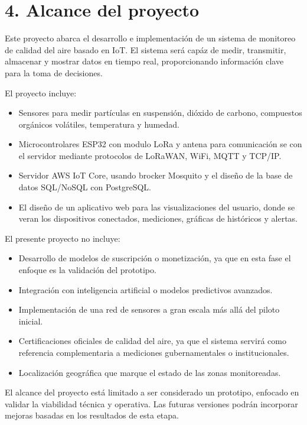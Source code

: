 \documentclass[
11pt, %
]{charter}
\begin{document}
\section{4. Alcance del proyecto}
\label{sec:alcance}

Este proyecto abarca el desarrollo e implementación de un sistema de monitoreo de calidad del aire basado en IoT. El sistema será capáz de medir, transmitir, almacenar y mostrar datos en tiempo real, proporcionando información clave para la toma de decisiones.

El proyecto incluye:

\begin{itemize}
	\item Sensores para medir partículas en suspensión, dióxido de carbono, compuestos orgánicos volátiles, temperatura y humedad.
	\item Microcontrolares ESP32 con modulo LoRa y antena para comunicación se con el servidor mediante protocolos de LoRaWAN, WiFi, MQTT y TCP/IP.
	\item Servidor AWS IoT Core, usando brocker Mosquito y el diseño de la base de datos SQL/NoSQL con PostgreSQL.
	\item El diseño de un aplicativo web para las visualizaciones del usuario, donde se veran los dispositivos conectados, mediciones, gráficas de históricos y alertas.
	
	
\end{itemize}

El presente proyecto no incluye:
\begin{itemize}
	\item Desarrollo de modelos de suscripción o monetización, ya que en esta fase el enfoque es la validación del prototipo.
	\item Integración con inteligencia artificial o modelos predictivos avanzados.
	\item Implementación de una red de sensores a gran escala más allá del piloto inicial.
	\item Certificaciones oficiales de calidad del aire, ya que el sistema servirá como referencia complementaria a mediciones gubernamentales o institucionales.
	\item Localización geográfica que marque el estado de las zonas monitoreadas.
\end{itemize}

El alcance del proyecto está limitado a ser considerado un prototipo, enfocado en validar la viabilidad técnica y operativa. Las futuras versiones podrán incorporar mejoras basadas en los resultados de esta etapa.
\end{document}
